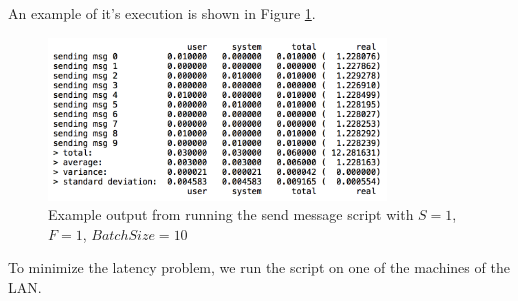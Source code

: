 An example of it's execution is shown in Figure \ref{send-msg-output}.

\begin{figure}[htb]
	\centering
	\includegraphics[width=0.8\textwidth]{images/send-msg-output}
	\caption{Example output from running the send message script with $S = 1$, $F = 1$, $BatchSize = 10$}
	\label{send-msg-output}
\end{figure}

To minimize the latency problem, we run the  script on one of the machines of the LAN.